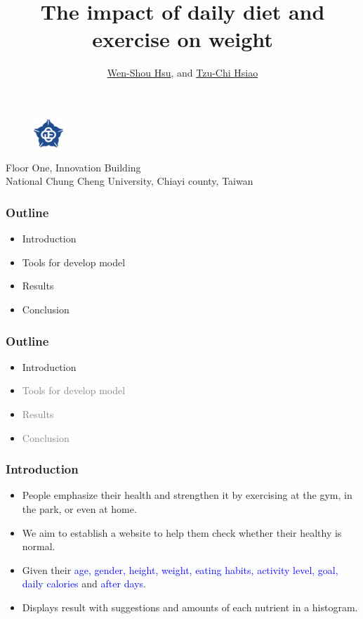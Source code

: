 \documentclass[fleqn]{beamer}
\title{The impact of daily diet and exercise on weight}
\author{\href{mailto: hwshuo111u@cs.ccu.edu.tw}{Wen-Shou Hsu}, and  \href{mailto: stchi111u@cs.ccu.edu.tw}{Tzu-Chi Hsiao}}
\date{}
\begin{document}
\begin{frame}
\titlepage
\begin{figure}[h]
\centering
\includegraphics[width=0.10\textwidth]{logo.png}
\end{figure}
\begin{center}
Floor One, Innovation Building \\
National Chung Cheng University, Chiayi county, Taiwan
\end{center}
\end{frame}
\begin{frame}
\frametitle{Outline}
\begin{itemize}
\item Introduction \\
\item Tools for develop model \\
\item Results \\
\item Conclusion
\end{itemize}
\end{frame}
\begin{frame}
\frametitle{Outline}
\begin{itemize}
\item Introduction \\
\item \textcolor{gray}{Tools for develop model} \\
\item \textcolor{gray}{Results} \\
\item \textcolor{gray}{Conclusion}
\end{itemize}
\end{frame}
\begin{frame}
\frametitle{Introduction}
\begin{itemize}
\item People emphasize their health and strengthen it by exercising at the gym, in the park, or even at home. \\
\item We aim to establish a website to help them check whether their \alert{healthy} is normal. \\
\item Given their \textcolor{blue}{age, gender, height, weight, eating habits, activity level, goal, daily calories} and \textcolor{blue}{after days}. \\
\item Displays result with suggestions and amounts of each nutrient in a histogram. 
\end{itemize}
\end{frame}
\end{document}
